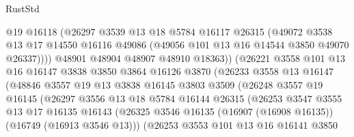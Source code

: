 \begin{lexlean}{RustStd}
\begin{coremodule}
                          @19
                          @16118
                          (@26297
                            @3539
                            @13
                            @18
                            @5784
                            @16117
                            @26315
                            (@49072
                              @3538
                              @13
                              @17
                              @14550
                              @16116
                              @49086
                              (@49056 @101 @13 @16 @14544 @3850 @49070 @26337))))
                        @48901
                        @48904
                        @48907
                        @48910
                        @18363))
                    (@26221
                      @3558
                      @101
                      @13
                      @16
                      @16147
                      @3838
                      @3850
                      @3864
                      @16126
                      @3870
                      (@26233
                        @3558
                        @13
                        @16147
                        (@48846
                          @3557
                          @19
                          @13
                          @3838
                          @16145
                          @3803
                          @3509
                          (@26248
                            @3557
                            @19
                            @16145
                            (@26297
                              @3556
                              @13
                              @18
                              @5784
                              @16144
                              @26315
                              (@26253
                                @3547
                                @3555
                                @13
                                @17
                                @16135
                                @16143
                                (@26325
                                  @3546
                                  @16135
                                  (@16907 (@16908 @16135))
                                  (@16749 (@16913 @3546 @13)))
                                (@26253
                                  @3553
                                  @101
                                  @13
                                  @16
                                  @16141
                                  @3850

\end{coremodule}
\end{lexlean}

